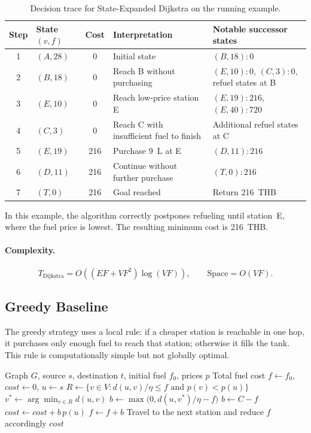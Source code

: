 \begin{table}[ht]
\centering
\caption{Decision trace for State-Expanded Dijkstra on the running example.}
\label{tab:dijkstra_trace}
\small
\begin{tabularx}{\textwidth}{c l c l X}
\toprule
Step & State $(v,f)$ & Cost & Interpretation & Notable successor states \\
\midrule
1 & $(A,28)$ & 0 & Initial state & $(B,18){:}0$ \\
2 & $(B,18)$ & 0 & Reach B without purchasing & $(E,10){:}0$, $(C,3){:}0$, refuel states at B \\
3 & $(E,10)$ & 0 & Reach low-price station E & $(E,19){:}216$, $(E,40){:}720$ \\
4 & $(C,3)$ & 0 & Reach C with insufficient fuel to finish & Additional refuel states at C \\
5 & $(E,19)$ & 216 & Purchase 9~L at E & $(D,11){:}216$ \\
6 & $(D,11)$ & 216 & Continue without further purchase & $(T,0){:}216$ \\
7 & $(T,0)$ & 216 & Goal reached & Return 216~THB \\
\bottomrule
\end{tabularx}
\end{table}

In this example, the algorithm correctly postpones refueling until station~E, where the fuel price is lowest. The resulting minimum cost is 216~THB.

\paragraph{Complexity.}
\[
T_{\mathrm{Dijkstra}}=O\!\left((EF+VF^{2})\log(VF)\right),
\qquad
\text{Space}=O(VF).
\]

\subsection{Greedy Baseline}
\label{subsec:greedy}

The greedy strategy uses a local rule: if a cheaper station is reachable in one hop, it purchases only enough fuel to reach that station; otherwise it fills the tank. This rule is computationally simple but not globally optimal.

\begin{algorithm}[H]
\caption{Greedy Fuel-Aware Routing}
\label{alg:greedy}
\begin{algorithmic}[1]
\Require Graph $G$, source $s$, destination $t$, initial fuel $f_0$, prices $p$
\Ensure Total fuel cost
\State $f \gets f_0$, $\mathit{cost} \gets 0$, $u \gets s$
    \State $R \gets \{v\in V : d(u,v)/\eta \le f \text{ and } p(v)<p(u)\}$
        \State $v^{*} \gets \arg\min_{v\in R} d(u,v)$
        \State $b \gets \max\bigl(0, d(u,v^{*})/\eta - f\bigr)$
    \Else
        \State $b \gets C-f$
    \EndIf
    \State $\mathit{cost} \gets \mathit{cost} + b\,p(u)$
    \State $f \gets f+b$
    \State Travel to the next station and reduce $f$ accordingly
\EndWhile
\State \Return $\mathit{cost}$
\end{algorithmic}
\end{algorithm}

